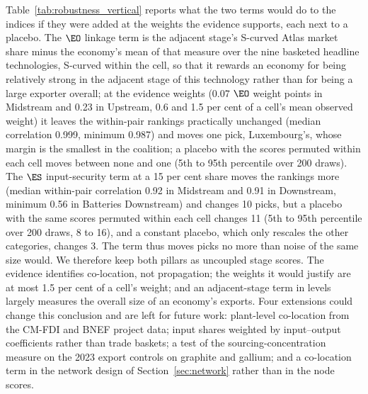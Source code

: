 Table~\ref{tab:robustness_vertical} reports what the two terms would do to the indices if they
were added at the weights the evidence supports, each next to a placebo. The $\EO$ linkage term
is the adjacent stage's S-curved Atlas market share minus the economy's mean of that measure over
the nine basketed headline technologies, S-curved within the cell, so that it rewards an economy
for being relatively strong in the adjacent stage of this technology rather than for being a
large exporter overall; at the evidence weights (0.07 $\EO$ weight points in Midstream and 0.23
in Upstream, 0.6 and 1.5 per cent of a cell's mean observed weight) it leaves the within-pair
rankings practically unchanged (median correlation 0.999, minimum 0.987) and moves one pick,
Luxembourg's, whose margin is the smallest in the coalition; a placebo with the scores permuted
within each cell moves between none and one (5th to 95th percentile over 200 draws). The $\ES$ input-security term at a 15 per cent share moves the
rankings more (median within-pair correlation 0.92 in Midstream and 0.91 in Downstream, minimum
0.56 in Batteries Downstream) and changes 10 picks, but a placebo with the same scores permuted
within each cell changes 11 (5th to 95th percentile over 200 draws, 8 to 16), and a constant
placebo, which only rescales the other categories, changes 3. The term thus moves picks no more
than noise of the same size would. We therefore keep both pillars as uncoupled stage scores. The
evidence identifies co-location, not propagation; the weights it would justify are at most 1.5 per
cent of a cell's weight; and an adjacent-stage term in levels largely measures the overall size
of an economy's exports. Four extensions could change this conclusion and are left for future
work: plant-level co-location from the CM-FDI and BNEF project data; input shares weighted by
input--output coefficients rather than trade baskets; a test of the sourcing-concentration
measure on the 2023 export controls on graphite and gallium; and a co-location term in the
network design of Section~\ref{sec:network} rather than in the node scores.

